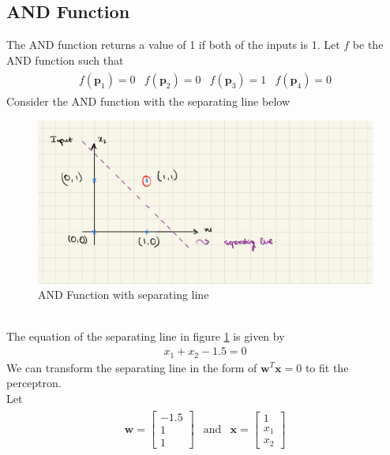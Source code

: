 \subsection{AND Function}
The AND function returns a value of 1 if both of the inputs is 1. Let $f$ be the AND function such that
\begin{align}
\begin{matrix}
  \nonumber
  f(\textbf{p}_1) = 0 & f(\textbf{p}_2) = 0 & f(\textbf{p}_3) = 1 & f(\textbf{p}_4) = 0
\end{matrix}  
\end{align}
Consider the AND function with the separating line below
\begin{figure}[ht]
  \centering
  \includegraphics[scale=0.15]{CHAPTER_2/c2_fig_AND_function.jpeg}
  \caption{AND Function with separating line}
  \label{AND_function_2}
\end{figure}\\
The equation of the separating line in figure \ref{AND_function_2} is given by
\begin{align}
  x_1 + x_2 -1.5 = 0
\end{align}
We can transform the separating line in the form of $\textbf{w}^T\textbf{x} = 0$ to fit the perceptron.\\
Let 
\begin{align}
  \begin{matrix}
    \textbf{w} = \begin{bmatrix}
      -1.5 \\
      1 \\
      1
    \end{bmatrix} & \text{and} & \textbf{x} = \begin{bmatrix}
      1 \\
      x_1 \\
      x_2
    \end{bmatrix}
  \end{matrix}
\end{align}
